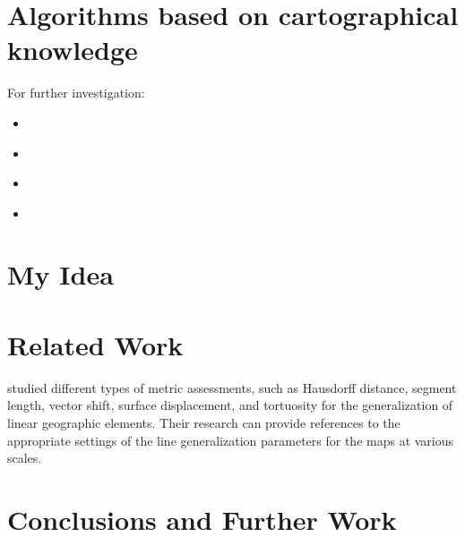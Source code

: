 \documentclass{article}
\begin{document}
\section{Algorithms based on cartographical knowledge}

For further investigation:
\begin{itemize}
    \item \cite{jiang2003line}
    \item \cite{dyken2009simultaneous}
    \item \cite{mustafa2006dynamic}
    \item \cite{nollenburg2008morphing}
\end{itemize}

\section{My Idea}
\label{sec:my_idea}

\section{Related Work}
\label{sec:related_work}

\cite{stanislawski2012automated} studied different types of metric assessments,
such as Hausdorff distance, segment length, vector shift, surface displacement,
and tortuosity for the generalization of linear geographic elements. Their
research can provide references to the appropriate settings of the line
generalization parameters for the maps at various scales.


\section{Conclusions and Further Work}
\label{sec:conclusions_and_further_work}

\printbibliography
\end{document}
